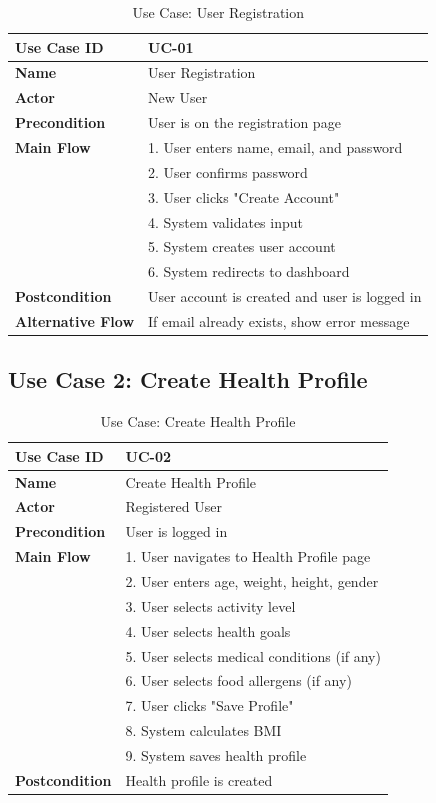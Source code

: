 \begin{table}[H]
\centering
\begin{tabular}{|l|p{10cm}|}
\hline
\textbf{Use Case ID} & UC-01 \\
\hline
\textbf{Name} & User Registration \\
\hline
\textbf{Actor} & New User \\
\hline
\textbf{Precondition} & User is on the registration page \\
\hline
\textbf{Main Flow} & 
1. User enters name, email, and password \\
& 2. User confirms password \\
& 3. User clicks "Create Account" \\
& 4. System validates input \\
& 5. System creates user account \\
& 6. System redirects to dashboard \\
\hline
\textbf{Postcondition} & User account is created and user is logged in \\
\hline
\textbf{Alternative Flow} & If email already exists, show error message \\
\hline
\end{tabular}
\caption{Use Case: User Registration}
\end{table}

\subsection{Use Case 2: Create Health Profile}

\begin{table}[H]
\centering
\begin{tabular}{|l|p{10cm}|}
\hline
\textbf{Use Case ID} & UC-02 \\
\hline
\textbf{Name} & Create Health Profile \\
\hline
\textbf{Actor} & Registered User \\
\hline
\textbf{Precondition} & User is logged in \\
\hline
\textbf{Main Flow} & 
1. User navigates to Health Profile page \\
& 2. User enters age, weight, height, gender \\
& 3. User selects activity level \\
& 4. User selects health goals \\
& 5. User selects medical conditions (if any) \\
& 6. User selects food allergens (if any) \\
& 7. User clicks "Save Profile" \\
& 8. System calculates BMI \\
& 9. System saves health profile \\
\hline
\textbf{Postcondition} & Health profile is created \\
\hline
\end{tabular}
\caption{Use Case: Create Health Profile}
\end{table}

